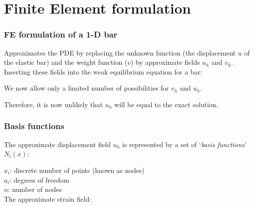 \documentclass[notes]{beamer}
\begin{document}
\section{Finite Element formulation}
\begin{frame}
\frametitle{FE formulation of a 1-D bar}
Approximates the PDE by replacing the unknown function (the displacement $u$ 
of the elastic bar) and the weight function ($v$) by approximate fields $u_h$ and $v_h$. Inserting these fields into the weak equilibrium equation for a bar:
	
We now allow only a limited number of possibilities for $v_h$ and $u_h$. 

Therefore, it is now unlikely that $u_h$ will be equal to the exact solution.
\end{frame}

\begin{frame}
\frametitle{Basis functions}
	The approximate displacement field $u_h$ is represented by a set of `\textit{basis
	functions}' $N_i(x)$:


$x_i$: discrete number of points (known as nodes)\\ 
$a_i$: degrees of freedom\\
$n$: number of nodes\\
The approximate strain field:
\end{frame}
\end{document}
